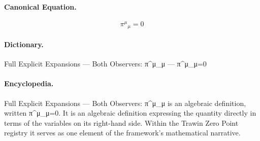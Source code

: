 \paragraph{Canonical Equation.}
\[
\pi^\mu{}_\mu=0
\]

\paragraph{Dictionary.}
Full Explicit Expansions — Both Observers: π\textasciicircum{}μ\_μ — π\textasciicircum{}μ\_μ=0

\paragraph{Encyclopedia.}
Full Explicit Expansions — Both Observers: π\textasciicircum{}μ\_μ is an algebraic definition, written π\textasciicircum{}μ\_μ=0. It is an algebraic definition expressing the quantity directly in terms of the variables on its right-hand side. Within the Trawin Zero Point registry it serves as one element of the framework's mathematical narrative.
